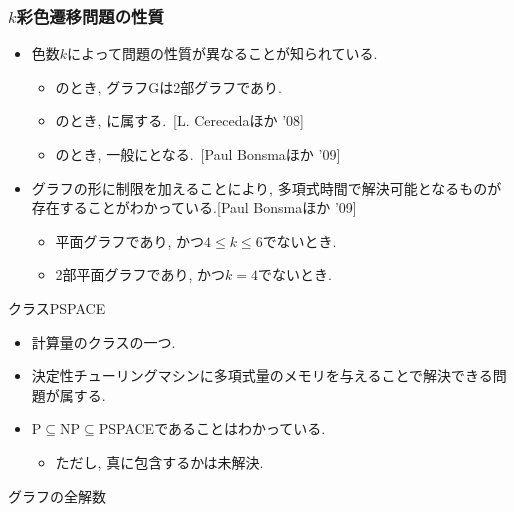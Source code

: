 \begin{frame}\frametitle{$k$彩色遷移問題の性質}

  \begin{itemize}
    \item 色数$k$によって問題の性質が異なることが知られている.
    \begin{itemize}
      \item {}のとき, グラフGは2部グラフであり.
      \item {}のとき, に属する.~[L. Cerecedaほか '08]
      \item {}のとき, 一般にとなる.~[Paul Bonsmaほか '09]
    \end{itemize}

    \item グラフの形に制限を加えることにより, 多項式時間で解決可能となるものが存在することがわかっている.[Paul Bonsmaほか '09]
    \begin{itemize}
      \item 平面グラフであり, かつ$4 \le k \le 6$でないとき.
      \item 2部平面グラフであり, かつ$k=4$でないとき.
    \end{itemize}

  \end{itemize}

\end{frame}


\begin{frame}{クラスPSPACE}
  \begin{itemize}
    \item 計算量のクラスの一つ.
    \item 決定性チューリングマシンに多項式量のメモリを与えることで解決できる問題が属する.
    \item P$\subseteq$NP$\subseteq$PSPACEであることはわかっている.
    \begin{itemize}
      \item ただし, 真に包含するかは未解決.
    \end{itemize}
  \end{itemize}
\end{frame}


\begin{frame}{グラフの全解数}
  \begin{table}[t]
    \centering
    
  \end{table}
\end{frame}

\backupend